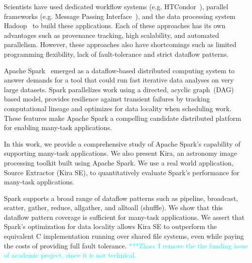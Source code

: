 \documentclass[10pt, conference, compsocconf]{IEEEtran}
\newcommand{\zhaonote}[1]{{\textcolor{cyan}    { ***Zhao:      #1 }}}
\newcommand{\zhaonote}[1]{}
\begin{document}
Scientists have used dedicated workflow systems (e.g. HTCondor~\cite{litzkow88}), parallel frameworks (e.g. Message Passing Interface~\cite{gropp96}), and  the data processing system Hadoop~\cite{HADOOP}  to build these applications. Each of these approaches has its own advantages such as provenance tracking, high scalability, and automated parallelism. However, these approaches also have shortcomings such as limited programming flexibility, lack of fault-tolerance and strict dataflow patterns.


Apache Spark~\cite{zaharia12} emerged as a dataflow-based distributed computing system
to answer demands for a tool that could run fast iterative data analyses on very large datasets.
Spark parallelizes work using a directed, acyclic graph~(DAG) based model,
provides resilience against transient failures by tracking computational lineage
and optimizes for data locality when scheduling work.
These features make Apache Spark a compelling candidate distributed platform for enabling many-task applications.

In this work, we provide a comprehensive study of Apache Spark's capability of supporting many-task applications. 
We also present Kira, an astronomy image processing toolkit built using Apache Spark. 
We use a real world application, Source Extractor (Kira SE), to quantitatively evaluate \linebreak Spark's performance for many-task applications.



Spark supports a broad range of dataflow patterns such as pipeline, broadcast, scatter, gather, reduce, allgather, 
and alltoall (shuffle).
We show that this dataflow pattern coverage is sufficient for many-task applications. 
We assert that Spark's optimization for data locality allows Kira SE to outperform the equivalent C implementation 
running over shared file systems, even while paying the costs of providing full fault tolerance. 
\zhaonote{I remove the the funding issue of academic project, since it is not technical.}
\end{document}
